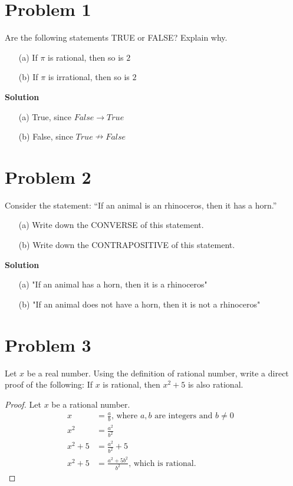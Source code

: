 \documentclass{article}
\newenvironment{problem}[1]{
  \nobreak\section*{Problem #1}
}{}
\begin{document}
  \begin{problem}{1}
    Are the following statements TRUE or FALSE? Explain why.
    
    \begin{enumerate}
      \item[(a)] If $\pi$ is rational, then so is $2$
      \item[(b)] If $\pi$ is irrational, then so is $2$
    \end{enumerate}
    
    \noindent\textbf{Solution}

    \begin{enumerate}
      \item[(a)] True, since $False \rightarrow True$
      \item[(b)] False, since $True \nrightarrow False$ 
    \end{enumerate}
  \end{problem}

  \begin{problem}{2}
    Consider the statement: “If an animal is an rhinoceros, then it has a horn.”

    \begin{enumerate}
      \item[(a)] Write down the CONVERSE of this statement.
      \item[(b)] Write down the CONTRAPOSITIVE of this statement. 
    \end{enumerate}

    \noindent\textbf{Solution}

    \begin{enumerate}
      \item[(a)] "If an animal has a horn, then it is a rhinoceros"
      \item[(b)] "If an animal does not have a horn, then it is not a rhinoceros" 
    \end{enumerate}
  \end{problem}

  \begin{problem}{3}
    Let $x$ be a real number. Using the definition of rational number, write a direct proof of the following: If $x$ is rational, then $x^2 + 5$ is also rational.

    \begin{proof}
      Let $x$ be a rational number.
      \begin{equation*}
        \begin{split}
          x & = \frac{a}{b}\text{, where $a, b$ are integers and $b \neq 0$ }\\
          x^2 & = \frac{a^2}{b^2}\\
          x^2 + 5 & = \frac{a^2}{b^2} + 5\\
          x^2 + 5 & = \frac{a^2 + 5b^2}{b^2}\text{, which is rational.}
        \end{split}
      \end{equation*}
    \end{proof}
  \end{problem}
\end{document}
